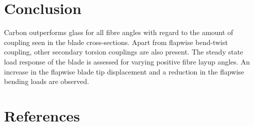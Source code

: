 \documentclass[a4paper]{jpconf}
\begin{document}
\section{Conclusion}
\label{sec:conclusion}
 Carbon outperforms glass for all fibre angles with regard to the amount of coupling seen in the blade cross-sections. Apart from flapwise bend-twist coupling, other secondary torsion couplings are also present. The steady state load response of the blade is assessed for varying positive fibre layup angles. An increase in the flapwise blade tip displacement and a reduction in the flapwise bending loads are observed.

\section*{References}


\end{document}

